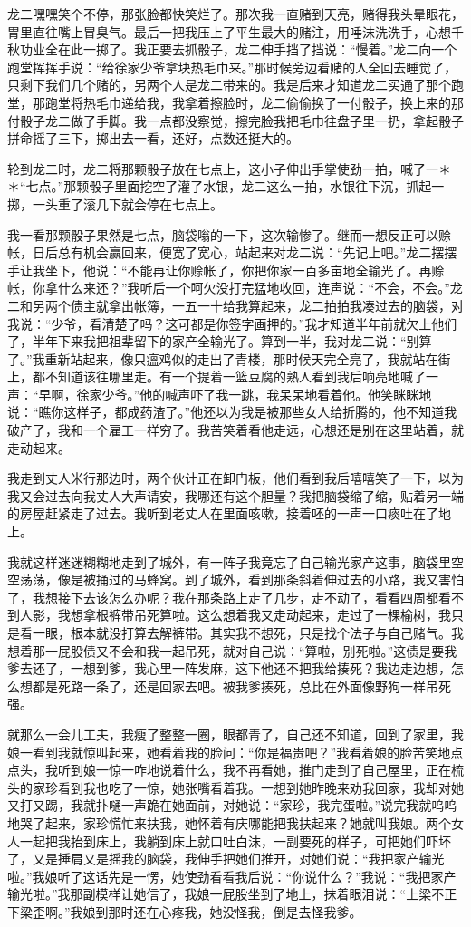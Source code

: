 \documentclass[12pt,UTF8]{ctexbook}
\begin{document}
龙二嘿嘿笑个不停，那张脸都快笑烂了。那次我一直赌到天亮，赌得我头晕眼花，胃里直往嘴上冒臭气。最后一把我压上了平生最大的赌注，用唾沫洗洗手，心想千秋功业全在此一掷了。我正要去抓骰子，龙二伸手挡了挡说：“慢着。”龙二向一个跑堂挥挥手说：“给徐家少爷拿块热毛巾来。”那时候旁边看赌的人全回去睡觉了，只剩下我们几个赌的，另两个人是龙二带来的。我是后来才知道龙二买通了那个跑堂，那跑堂将热毛巾递给我，我拿着擦脸时，龙二偷偷换了一付骰子，换上来的那付骰子龙二做了手脚。我一点都没察觉，擦完脸我把毛巾往盘子里一扔，拿起骰子拼命摇了三下，掷出去一看，还好，点数还挺大的。

轮到龙二时，龙二将那颗骰子放在七点上，这小子伸出手掌使劲一拍，喊了一＊＊“七点。”那颗骰子里面挖空了灌了水银，龙二这么一拍，水银往下沉，抓起一掷，一头重了滚几下就会停在七点上。

我一看那颗骰子果然是七点，脑袋嗡的一下，这次输惨了。继而一想反正可以赊帐，日后总有机会赢回来，便宽了宽心，站起来对龙二说：“先记上吧。”龙二摆摆手让我坐下，他说：“不能再让你赊帐了，你把你家一百多亩地全输光了。再赊帐，你拿什么来还？”我听后一个呵欠没打完猛地收回，连声说：“不会，不会。”龙二和另两个债主就拿出帐簿，一五一十给我算起来，龙二拍拍我凑过去的脑袋，对我说：“少爷，看清楚了吗？这可都是你签字画押的。”我才知道半年前就欠上他们了，半年下来我把祖辈留下的家产全输光了。算到一半，我对龙二说：“别算了。”我重新站起来，像只瘟鸡似的走出了青楼，那时候天完全亮了，我就站在街上，都不知道该往哪里走。有一个提着一篮豆腐的熟人看到我后响亮地喊了一声：“早啊，徐家少爷。”他的喊声吓了我一跳，我呆呆地看着他。他笑眯眯地说：“瞧你这样子，都成药渣了。”他还以为我是被那些女人给折腾的，他不知道我破产了，我和一个雇工一样穷了。我苦笑着看他走远，心想还是别在这里站着，就走动起来。

我走到丈人米行那边时，两个伙计正在卸门板，他们看到我后嘻嘻笑了一下，以为我又会过去向我丈人大声请安，我哪还有这个胆量？我把脑袋缩了缩，贴着另一端的房屋赶紧走了过去。我听到老丈人在里面咳嗽，接着呸的一声一口痰吐在了地上。

我就这样迷迷糊糊地走到了城外，有一阵子我竟忘了自己输光家产这事，脑袋里空空荡荡，像是被捅过的马蜂窝。到了城外，看到那条斜着伸过去的小路，我又害怕了，我想接下去该怎么办呢？我在那条路上走了几步，走不动了，看看四周都看不到人影，我想拿根裤带吊死算啦。这么想着我又走动起来，走过了一棵榆树，我只是看一眼，根本就没打算去解裤带。其实我不想死，只是找个法子与自己赌气。我想着那一屁股债又不会和我一起吊死，就对自己说：“算啦，别死啦。”这债是要我爹去还了，一想到爹，我心里一阵发麻，这下他还不把我给揍死？我边走边想，怎么想都是死路一条了，还是回家去吧。被我爹揍死，总比在外面像野狗一样吊死强。

就那么一会儿工夫，我瘦了整整一圈，眼都青了，自己还不知道，回到了家里，我娘一看到我就惊叫起来，她看着我的脸问：“你是福贵吧？”我看着娘的脸苦笑地点点头，我听到娘一惊一咋地说着什么，我不再看她，推门走到了自己屋里，正在梳头的家珍看到我也吃了一惊，她张嘴看着我。一想到她昨晚来劝我回家，我却对她又打又踢，我就扑嗵一声跪在她面前，对她说：“家珍，我完蛋啦。”说完我就呜呜地哭了起来，家珍慌忙来扶我，她怀着有庆哪能把我扶起来？她就叫我娘。两个女人一起把我抬到床上，我躺到床上就口吐白沫，一副要死的样子，可把她们吓坏了，又是捶肩又是摇我的脑袋，我伸手把她们推开，对她们说：“我把家产输光啦。”我娘听了这话先是一愣，她使劲看看我后说：“你说什么？”我说：“我把家产输光啦。”我那副模样让她信了，我娘一屁股坐到了地上，抹着眼泪说：“上梁不正下梁歪啊。”我娘到那时还在心疼我，她没怪我，倒是去怪我爹。
\end{document}
